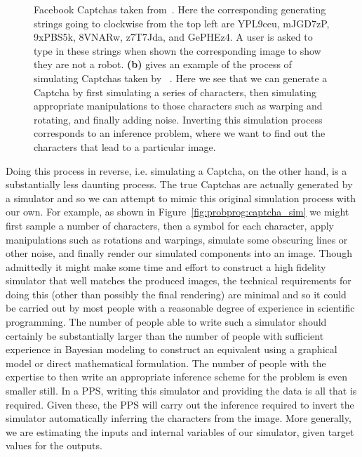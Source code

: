 \begin{figure}[t]
{		Facebook Captchas taken from~\cite{le2017using}.  Here the corresponding
		generating strings going
		to clockwise from the top left are YPL9ceu, mJGD7zP, 9xPBS5k, 8VNARw, z7T7Jda, and
		GePHEz4.  A user is asked to type in these strings when shown the corresponding
		image to show they are not a robot.
		\textbf{(b)} gives an example of the process of simulating Captchas taken by
		~\cite{le2017inference}.  Here we see that we can generate a Captcha by first
		simulating a series of characters, then simulating appropriate manipulations 
		to those characters such as warping and rotating, and finally adding noise.  Inverting this
		simulation process corresponds to an inference problem, where we want to find
		out the characters that lead to a particular image.
		\label{fig:probprog:captcha}}
\end{figure}

Doing this process in reverse, i.e. simulating a Captcha, on the other hand, is a substantially
less daunting process.  The true Captchas are actually generated by
a simulator and so we can attempt to mimic this original simulation process with our own.
For example, as shown in Figure~\ref{fig:probprog:captcha_sim} we might first sample a 
number of characters, then a symbol for each character, apply manipulations such as rotations and warpings, simulate
some obscuring lines or other noise, and finally render our simulated components into an
image.  Though admittedly it might make some time and effort to construct a high fidelity
simulator that well matches the produced images, the technical requirements for doing this
(other than possibly the final rendering) are minimal and so it could be carried out by most
people with a reasonable degree of experience in scientific programming.  The number of
people able to write such a simulator should certainly be substantially larger than the
number of people with sufficient experience in Bayesian modeling to construct an equivalent
using a graphical model or direct mathematical formulation.  The number of people
with the expertise to then write an appropriate inference scheme for the problem is even
smaller still.  In a PPS, writing this simulator and providing the data is all that is required.
Given these, the PPS will carry out the inference required to invert the simulator automatically
inferring the characters from the image.  More generally, we are estimating the inputs and
internal variables of our simulator, given target values for the outputs.

